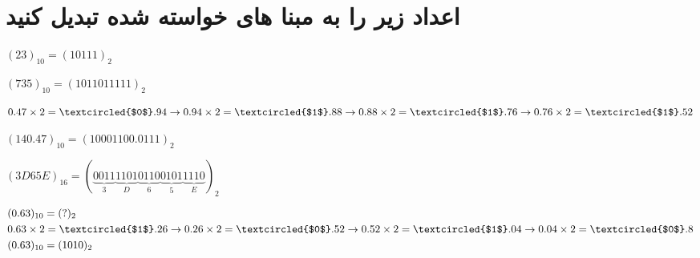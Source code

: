 \section{اعداد زیر را به مبنا های خواسته شده تبدیل کنید}

\begin{LTR}


$ (23)_{10} = (10111)_2 $
\vspace{1cm}


$ (735)_{10} = (1011011111)_2 $
\vspace{1cm}


$0.47 \times 2 = \textcircled{$0$}.94 \to 0.94 \times 2 = \textcircled{$1$}.88 \to 0.88 \times 2 = \textcircled{$1$}.76 \to 0.76 \times 2 = \textcircled{$1$}.52$

$ (140.47)_{10} = (10001100.0111)_2 $
\vspace{1cm}


$ (3D65E)_{16} = (\underbrace{0011}_{3} \underbrace{1101}_{D} \underbrace{0110}_{6} \underbrace{0101}_{5} \underbrace{1110}_{E})_2 $


\end{LTR}


\begin{align*}
&(0.63)_{10} = (?)_2 \\
&0.63 \times 2 = \textcircled{$1$}.26 \to 0.26 \times 2 = \textcircled{$0$}.52 \to 0.52 \times 2 = \textcircled{$1$}.04 \to 0.04 \times 2 = \textcircled{$0$}.8 \\
&(0.63)_{10} = (1010)_2 \\ 
\end{align*}

